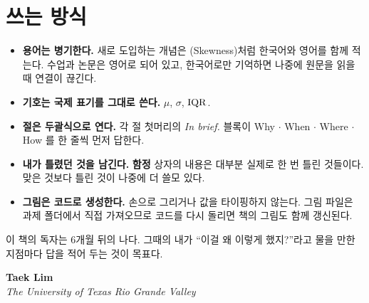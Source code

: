 \section*{쓰는 방식}

\begin{itemize}
  \item \textbf{용어는 병기한다.} 새로 도입하는 개념은 (Skewness)처럼
        한국어와 영어를 함께 적는다. 수업과 논문은 영어로 되어 있고, 한국어로만
        기억하면 나중에 원문을 읽을 때 연결이 끊긴다.
  \item \textbf{기호는 국제 표기를 그대로 쓴다.} $\mu$, $\sigma$, $\mathrm{IQR}$.
  \item \textbf{절은 두괄식으로 연다.} 각 절 첫머리의 \textit{In brief.} 블록이
        Why $\cdot$ When $\cdot$ Where $\cdot$ How 를 한 줄씩 먼저 답한다.
  \item \textbf{내가 틀렸던 것을 남긴다.} \textbf{함정} 상자의 내용은 대부분 실제로
        한 번 틀린 것들이다. 맞은 것보다 틀린 것이 나중에 더 쓸모 있다.
  \item \textbf{그림은 코드로 생성한다.} 손으로 그리거나 값을 타이핑하지 않는다.
        그림 파일은 과제 폴더에서 직접 가져오므로 코드를 다시 돌리면 책의 그림도
        함께 갱신된다.
\end{itemize}

\begin{aside}[읽는 사람에게]
이 책의 독자는 6개월 뒤의 나다. 그때의 내가 ``이걸 왜 이렇게 했지?''라고 물을
만한 지점마다 답을 적어 두는 것이 목표다.
\end{aside}

\vfill
\noindent\textbf{Taek Lim}\\
\textit{The University of Texas Rio Grande Valley}
